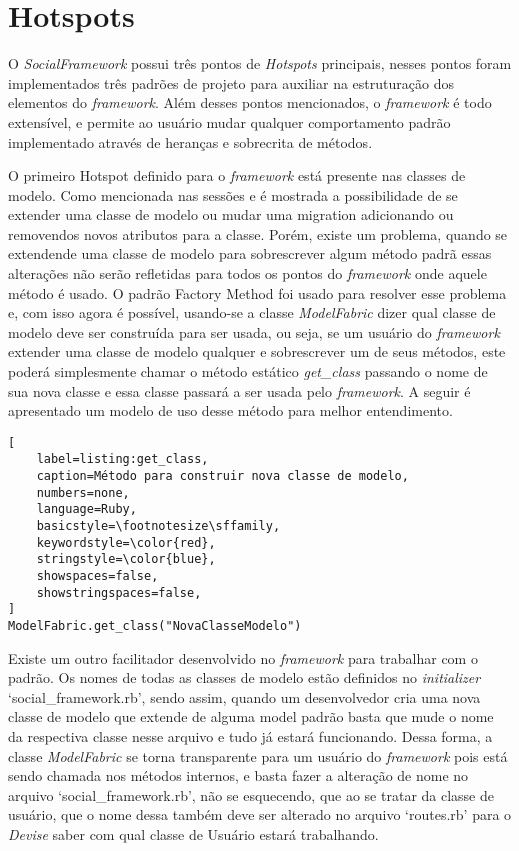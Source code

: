 \section{Hotspots}

O \textit{SocialFramework} possui três pontos de \textit{Hotspots} principais, nesses pontos foram implementados três padrões de projeto para auxiliar na estruturação dos elementos do \textit{framework}. Além desses pontos mencionados, o \textit{framework} é todo extensível, e permite ao usuário mudar qualquer comportamento padrão implementado através de heranças e sobrecrita de métodos.

O primeiro Hotspot definido para o \textit{framework} está presente nas classes de modelo. Como mencionada nas sessões  e  é mostrada a possibilidade de se extender uma classe de modelo ou mudar uma migration adicionando ou removendos novos atributos para a classe. Porém, existe um problema, quando se extendende uma classe de modelo para sobrescrever algum método padrã essas alterações não serão refletidas para todos os pontos do \textit{framework} onde aquele método é usado. O padrão Factory Method foi usado para resolver esse problema e, com isso agora é possível, usando-se a classe \textit{ModelFabric} dizer qual classe de modelo deve ser construída para ser usada, ou seja, se um usuário do \textit{framework} extender uma classe de modelo qualquer e sobrescrever um de seus métodos, este poderá simplesmente chamar o método estático \textit{get\_class} passando o nome de sua nova classe e essa classe passará a ser usada pelo \textit{framework}. A seguir é apresentado um modelo de uso desse método para melhor entendimento.

\begin{lstlisting}[
    label=listing:get_class,
    caption=Método para construir nova classe de modelo,
    numbers=none,
    language=Ruby,
    basicstyle=\footnotesize\sffamily,
    keywordstyle=\color{red},
    stringstyle=\color{blue},
    showspaces=false,
    showstringspaces=false,
]
ModelFabric.get_class("NovaClasseModelo")
\end{lstlisting}

Existe um outro facilitador desenvolvido no \textit{framework} para trabalhar com o padrão. Os nomes de todas as classes de modelo estão definidos no \textit{initializer} `social\_framework.rb', sendo assim, quando um desenvolvedor cria uma nova classe de modelo que extende de alguma model padrão basta que mude o nome da respectiva classe nesse arquivo e tudo já estará funcionando. Dessa forma, a classe \textit{ModelFabric} se torna transparente para um usuário do \textit{framework} pois está sendo chamada nos métodos internos, e basta fazer a alteração de nome no arquivo `social\_framework.rb', não se esquecendo, que ao se tratar da classe de usuário, que o nome dessa também deve ser alterado no arquivo `routes.rb' para o \textit{Devise} saber com qual classe de Usuário estará trabalhando.

